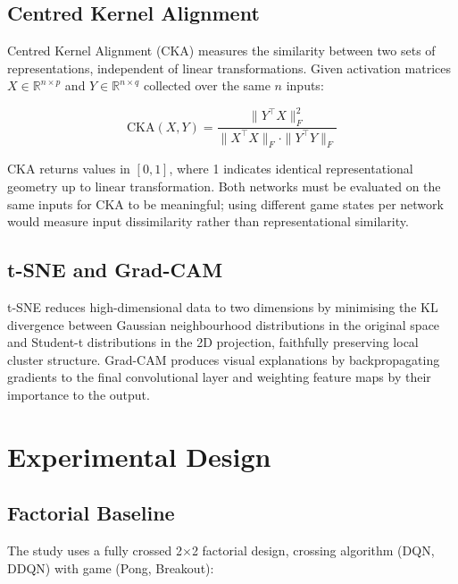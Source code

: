 \documentclass[a4paper]{article}
\begin{document}
\subsection{Centred Kernel Alignment}

Centred Kernel Alignment (CKA) \cite{kornblith2019similarity} measures the similarity between two sets of representations, independent of linear transformations. Given activation matrices $X \in \mathbb{R}^{n \times p}$ and $Y \in \mathbb{R}^{n \times q}$ collected over the same $n$ inputs:

\begin{equation}
    \text{CKA}(X, Y) = \frac{\|Y^{\top}X\|_F^2}{\|X^{\top}X\|_F \cdot \|Y^{\top}Y\|_F}
\end{equation}

CKA returns values in $[0, 1]$, where 1 indicates identical representational geometry up to linear transformation. Both networks must be evaluated on the same inputs for CKA to be meaningful; using different game states per network would measure input dissimilarity rather than representational similarity.

\subsection{t-SNE and Grad-CAM}

t-SNE \cite{van2008visualizing} reduces high-dimensional data to two dimensions by minimising the KL divergence between Gaussian neighbourhood distributions in the original space and Student-t distributions in the 2D projection, faithfully preserving local cluster structure. Grad-CAM \cite{selvaraju2017grad} produces visual explanations by backpropagating gradients to the final convolutional layer and weighting feature maps by their importance to the output.

\section{Experimental Design}
\label{sec:method}

\subsection{Factorial Baseline}

The study uses a fully crossed 2$\times$2 factorial design, crossing algorithm (DQN, DDQN) with game (Pong, Breakout):
\end{document}
